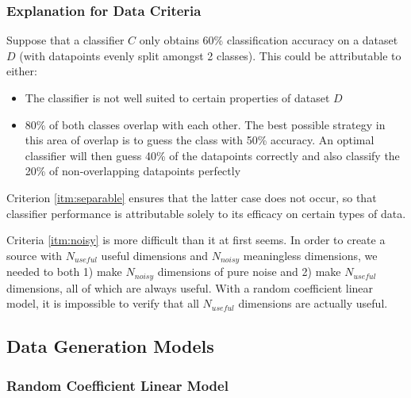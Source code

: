 \documentclass{article}
\begin{document}
\subsubsection*{Explanation for Data Criteria}

Suppose that a classifier $C$ only obtains 60\% classification accuracy on a
dataset $D$ (with datapoints evenly split amongst 2 classes). This could be
attributable to either:
\begin{itemize}
    \item The classifier is not well suited to certain properties of dataset $D$
    \item 80\% of both classes overlap with each other. The best possible
        strategy in this area of overlap is to guess the class with 50\%
        accuracy. An optimal classifier will then guess 40\% of the datapoints
        correctly and also classify the 20\% of non-overlapping datapoints
        perfectly
\end{itemize}
Criterion \ref{itm:separable} ensures that the latter case does not occur,
so that classifier performance is attributable solely to its efficacy on
certain types of data.

Criteria \ref{itm:noisy} is more difficult than it at first seems. In
order to create a source with $N_{useful}$ useful dimensions and $N_{noisy}$
meaningless dimensions, we needed to both 1) make $N_{noisy}$ dimensions of
pure noise and 2) make $N_{useful}$ dimensions, all of which are always useful.
With a random coefficient linear model, it is impossible to verify that all
$N_{useful}$ dimensions are actually useful.



\subsection*{Data Generation Models}

\subsubsection*{Random Coefficient Linear Model}
\end{document}
